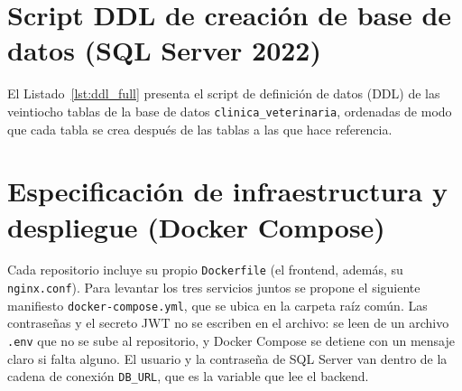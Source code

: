 \documentclass[11pt,a4paper]{report}
\begin{document}
\section{Script DDL de creación de base de datos (SQL Server 2022)}\label{anx:ddl}
El Listado~\ref{lst:ddl_full} presenta el script de definición de datos (DDL) de las veintiocho tablas de la base de datos \texttt{clinica\_veterinaria}, ordenadas de modo que cada tabla se crea después de las tablas a las que hace referencia.



\section{Especificación de infraestructura y despliegue (Docker Compose)}\label{anx:compose}
Cada repositorio incluye su propio \texttt{Dockerfile} (el frontend, además, su \texttt{nginx.conf}). Para levantar los tres servicios juntos se propone el siguiente manifiesto \texttt{docker-compose.yml}, que se ubica en la carpeta raíz común. Las contraseñas y el secreto JWT no se escriben en el archivo: se leen de un archivo \texttt{.env} que no se sube al repositorio, y Docker Compose se detiene con un mensaje claro si falta alguno. El usuario y la contraseña de SQL Server van dentro de la cadena de conexión \texttt{DB\_URL}, que es la variable que lee el backend.
\end{document}

